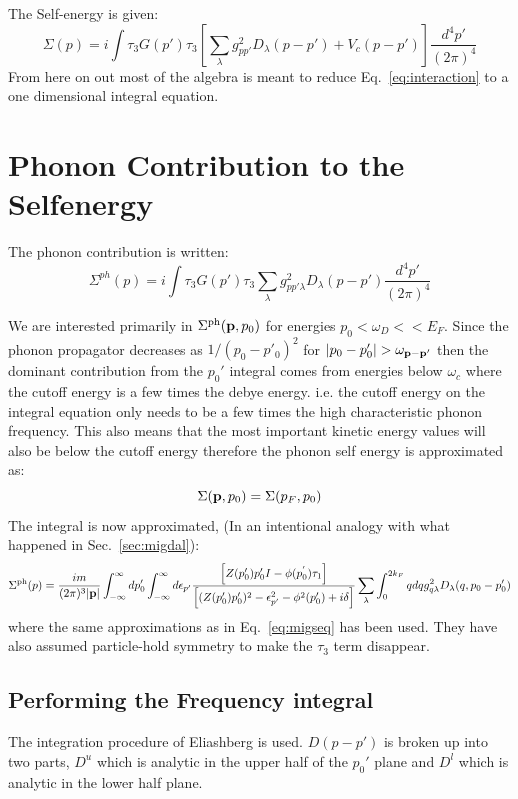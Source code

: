 The Self-energy is given:
%
\begin{equation}
\label{eq:interaction}
\Sigma(p) = i\int \tau_{3} G(p') \tau_{3} \left[\sum_{\lambda} g^{2}_{pp'}D_{\lambda}(p-p') + V_{c}(p-p') \right] 
\frac{d^{4}p'}{(2\pi)^{4}}
\end{equation}
%
From here on out most of the algebra is meant to reduce Eq.~\ref{eq:interaction} 
to a one dimensional integral equation.

\section{Phonon Contribution to the Selfenergy}
The phonon contribution is written:
%
\begin{equation}
\Sigma^{ph}(p) = i \int \tau_{3} G(p') \tau_{3} \sum_{\lambda} g^{2}_{pp'\lambda} D_{\lambda}(p-p')\frac{d^{4}p'}{(2\pi)^{4}}
\end{equation}
%

We are interested primarily in $\Sigma^{\rm ph}(\mathbf{p},p_{0})$ for energies $p_0 < \omega_{D} << E_{F}$. 
Since the phonon propagator decreases as $1/(p_0 - p'_0)^{2}$ for $|p_0 -p'_0| > \omega_{{\bf p}-{\bf p}'}$ then
the dominant contribution from the $p_{0}'$ integral comes from energies below $\omega_{c}$ where the cutoff
energy is a few times the debye energy. i.e. the cutoff energy on the integral equation only needs to be 
a few times the high characteristic phonon frequency. This also means that the most important kinetic energy
values will also be below the cutoff energy therefore the phonon self energy is approximated as:
%
\begin{equation}
\Sigma({\bf p},p_{0}) =  \Sigma(p_{F},p_{0})
\end{equation}
%
The integral is now approximated, (In an intentional analogy with what happened in Sec.~\ref{sec:migdal}):
%
\begin{equation}
\Sigma^{\rm ph}(p) =  \frac{im}{(2\pi)^{3}|{\bf p}|}\int_{-\infty}^{\infty} d p'_{0} \int_{-\infty}^{\infty}d \epsilon_{p'}
\frac{\left[Z(p_{0}')p'_{0}I - \phi(p^{'}_{0})\tau_{1} \right]}{\left[ (Z(p_{0}')p_{0}')^{2} - \epsilon_{p'}^{2} -\phi^{2}(p_{0}') + i\delta \right]}\sum_{\lambda}\int_{0}^{2k_{F}}q dq g^{2}_{q\lambda} D_{\lambda}(q,p_{0} - p_{0}')
\end{equation}
%
where the same approximations as in Eq.~\ref{eq:migseq} has been used. They have
also assumed particle-hold symmetry to make the $\tau_{3}$ term disappear. 

\subsection{Performing the Frequency integral}
The integration procedure of Eliashberg is used. $D(p-p')$ is broken up into two parts,
$D^{u}$ which is analytic in the upper half of the $p_{0}'$ plane and $D^{l}$ which
is analytic in the lower half plane.

